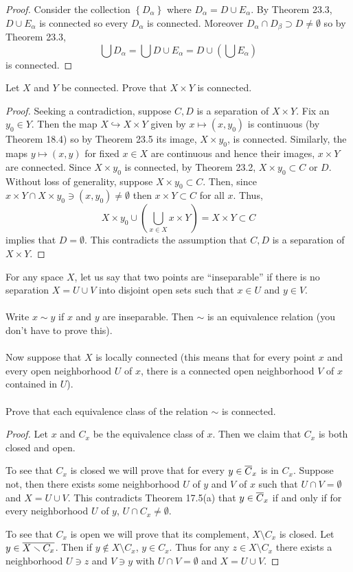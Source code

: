 \begin{proof}
Consider the collection $\left\{D_\alpha\right\}$ where
$D_\alpha=D\cup E_\alpha$. By Theorem 23.3, $D\cup E_\alpha$ is
connected so every $D_\alpha$ is connected. Moreover
$D_\alpha\cap D_\beta\supset D\neq\emptyset$ so by Theorem 23.3,
\[
\bigcup D_\alpha=\bigcup D\cup E_\alpha=D\cup\left(\bigcup E_\alpha\right)
\]
is connected.
\end{proof}
\begin{problem}
Let $X$ and $Y$ be connected. Prove that $X\times Y$ is connected.
\end{problem}
\begin{proof}
Seeking a contradiction, suppose $C,D$ is a separation of
$X\times Y$. Fix an $y_0\in Y$. Then the map
$X\hookrightarrow X\times Y$ given by $x\mapsto (x,y_0)$ is
continuous (by Theorem 18.4) so by Theorem 23.5 its image,
$X\times y_0$, is connected. Similarly, the maps $y\mapsto
(x,y)$ for fixed $x\in X$ are continuous and hence their images,
$x\times Y$ are connected. Since $X\times y_0$ is connected, by
Theorem 23.2, $X\times y_0\subset C$ or $D$. Without loss of
generality, suppose $X\times y_0\subset C$. Then, since $x\times
Y\cap X\times y_0\ni (x,y_0)\neq\emptyset$ then $x\times Y\subset
C$ for all $x$. Thus,
\[
X\times y_0\cup\left(\bigcup_{x\in X}x\times Y\right)=X\times
Y\subset C
\]
implies that $D=\emptyset$. This contradicts the assumption
that $C,D$ is a separation of $X\times Y$.
\end{proof}
\begin{problem}
For any space $X$, let us say that two points are ``inseparable''
if there is no separation $X=U\cup V$ into disjoint open sets
such that $x\in U$ and $y\in V$.
\\\\
Write $x\sim y$ if $x$ and $y$
are inseparable. Then $\sim$ is an equivalence relation (you
don't have to prove this).
\\\\
Now suppose that $X$ is locally connected (this means that for
every point $x$ and every open neighborhood $U$ of $x$, there is
a connected open neighborhood $V$ of $x$ contained in $U$).
\\\\
Prove that each equivalence class of the relation $\sim$ is connected.
\end{problem}
\begin{proof}
Let $x$ and $C_x$ be the equivalence class of $x$. Then we claim
that $C_x$ is both closed and open.

To see that $C_x$ is closed we will prove that for every
$y\in\overline{C}_x$ is in $C_x$. Suppose not, then there exists some
neighborhood $U$ of $y$ and $V$ of $x$ such that $U\cap
V=\emptyset$ and $X=U\cup V$. This contradicts Theorem 17.5(a)
that $y\in\overline{C}_x$ if and only if for every neighborhood $U$ of
$y$, $U\cap C_x\neq\emptyset$.

To see that $C_x$ is open we will prove that its complement,
$X\setminus C_x$ is closed. Let $y\in\overline{X\smallsetminus C_x}$. Then
if $y\notin X\setminus C_x$, $y\in C_x$. Thus for any $z\in
X\setminus C_x$ there exists a neighborhood $U\ni z$ and $V\ni y$
with $U\cap V=\emptyset$ and $X=U\cup V$.
\end{proof}

